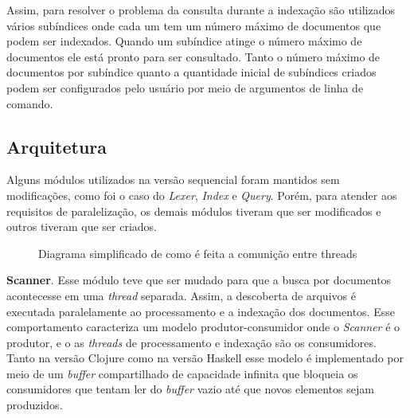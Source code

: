 Assim, para resolver o problema da consulta durante a indexação são utilizados vários subíndices onde cada um tem um número máximo de documentos que podem ser indexados. Quando um subíndice atinge o número máximo de documentos ele está pronto para ser consultado. Tanto o número máximo de documentos por subíndice quanto a quantidade inicial de subíndices criados podem ser configurados pelo usuário por meio de argumentos de linha de comando.

\subsection{Arquitetura}

Alguns módulos utilizados na versão sequencial foram mantidos sem modificações, como foi o caso do \emph{Lexer}, \emph{Index} e \emph{Query}. Porém, para atender aos requisitos de paralelização, os demais módulos tiveram que ser modificados e outros tiveram que ser criados.

\begin{figure}[h]
 \centering
 \def\svgwidth{0.6\columnwidth}
 
 \caption{Diagrama simplificado de como é feita a comunição entre threads}
\end{figure}

\textbf{Scanner}. Esse módulo teve que ser mudado para que a busca por documentos acontecesse em uma \emph{thread} separada. Assim, a descoberta de arquivos é executada paralelamente ao processamento e a indexação dos documentos. Esse comportamento caracteriza um modelo produtor-consumidor onde o \emph{Scanner} é o produtor, e o as \emph{threads} de processamento e indexação são os consumidores. Tanto na versão Clojure como na versão Haskell esse modelo é implementado por meio de um \emph{buffer} compartilhado de capacidade infinita que bloqueia os consumidores que tentam ler do \emph{buffer} vazio até que novos elementos sejam produzidos.

